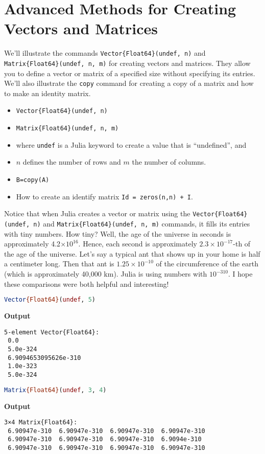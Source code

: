 \section{Advanced Methods for Creating Vectors and Matrices}
\label{sec:Chap2:AdvancedMethodsCreatingMatrices}

We'll illustrate the commands \texttt{Vector\{Float64\}(undef, n)} and  \texttt{Matrix\{Float64\}(undef, n, m)} for creating vectors and matrices. They allow you to define a vector or matrix of a specified size without specifying its entries. We'll also illustrate the \texttt{copy} command for creating a copy of a matrix and how to make an identity matrix.
\begin{itemize}
    \item \texttt{Vector\{Float64\}(undef, n)}
    \item \texttt{Matrix\{Float64\}(undef, n, m)}
    \item where \texttt{undef} is a Julia keyword to create a value that is ``undefined'', and
    \item $n$ defines the number of rows and $m$ the number of columns. 
    \item \texttt{B=copy(A)} 
    \item How to create an identify matrix \texttt{Id = zeros(n,n) + I}.
\end{itemize}

Notice that when Julia creates a vector or matrix using the \texttt{Vector\{Float64\}(undef, n)} and  \texttt{Matrix\{Float64\}(undef, n, m)}  commands, it fills its entries with tiny numbers. How tiny? Well, the age of the universe in seconds is approximately 4.2$\times 10^{16}$. Hence, each second is approximately $2.3\times 10^{-17}$-th of the age of the universe. Let's say a typical ant that shows up in your home is half a centimeter long. Then that ant is $1.25\times 10^{-10}$ of the circumference of the earth (which is approximately 40,000 km). Julia is using numbers with $10^{-310}.$ I hope these comparisons were both helpful and interesting! \\

\begin{lstlisting}[language=Julia,style=mystyle]
Vector{Float64}(undef, 5)
\end{lstlisting}
\textbf{Output} 
\begin{verbatim}
5-element Vector{Float64}:
 0.0
 5.0e-324
 6.9094653095626e-310
 1.0e-323
 5.0e-324
\end{verbatim}

\begin{lstlisting}[language=Julia,style=mystyle]
Matrix{Float64}(undef, 3, 4)
\end{lstlisting}
\textbf{Output} 
\begin{verbatim}
3×4 Matrix{Float64}:
 6.90947e-310  6.90947e-310  6.90947e-310  6.90947e-310
 6.90947e-310  6.90947e-310  6.90947e-310  6.9094e-310
 6.90947e-310  6.90947e-310  6.90947e-310  6.90947e-310
\end{verbatim}

